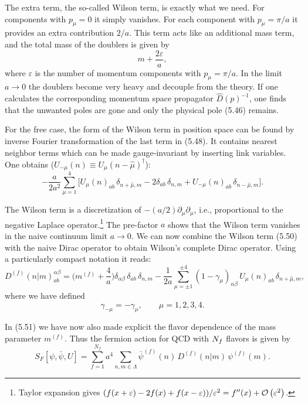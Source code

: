 The extra term, the so-called Wilson term, is exactly what we need. For
components with $p_\mu = 0$ it simply vanishes. For each component with $p_\mu =
\pi/a$ it provides an extra contribution $2/a$. This term acts like an additional
mass term, and the total mass of the doublers is given by
\begin{equation}
  m + \frac{2\varepsilon}{a} ,
\end{equation}
where $\varepsilon$ is the number of momentum components with $p_\mu = \pi/a$. In the limit
$a \to 0$ the doublers become very heavy and decouple from the theory. If one
calculates the corresponding momentum space propagator $\hat{D}(p)^{-1}$, one finds
that the unwanted poles are gone and only the physical pole (5.46) remains.

For the free case, the form of the Wilson term in position space can be
found by inverse Fourier transformation of the last term in (5.48). It contains
nearest neighbor terms which can be made gauge-invariant by inserting link
variables. One obtains ($U_{-\mu}(n) \equiv U_\mu(n-\hat{\mu})^\dagger$):
\begin{equation}
  -\frac{a}{2a^2}\sum_{\mu=1}^{4}\Big[
    U_\mu(n)_{ab}\,\delta_{n+\hat{\mu},m} - 2\delta_{ab}\,\delta_{n,m}
    + U_{-\mu}(n)_{ab}\,\delta_{n-\hat{\mu},m}\Big] .
\end{equation}

The Wilson term is a discretization of $-(a/2)\partial_\mu\partial_\mu$, i.e., proportional to the
negative Laplace operator.\footnote{Taylor expansion gives $(f(x + \varepsilon) - 2f(x) + f(x - \varepsilon))/\varepsilon^2 = f''(x) + \mathcal{O}\left(\varepsilon^2\right)$.} The pre-factor $a$ shows that the Wilson term
vanishes in the naive continuum limit $a \to 0$. We can now combine the Wilson
term (5.50) with the naive Dirac operator to obtain Wilson's complete Dirac
operator. Using a particularly compact notation it reads:
\begin{equation}
  D^{(f)}(n|m)^{\alpha\beta}_{ab}
    = \Big(m^{(f)} + \frac{4}{a}\Big)\delta_{\alpha\beta}\,\delta_{ab}\,\delta_{n,m}
    - \frac{1}{2a}\sum_{\mu=\pm1}^{\pm4}(1-\gamma_\mu)_{\alpha\beta}\,
      U_\mu(n)_{ab}\,\delta_{n+\hat{\mu},m} ,
\end{equation}
where we have defined
\begin{equation}
  \gamma_{-\mu} = -\gamma_\mu, \qquad \mu = 1, 2, 3, 4 .
\end{equation}

In (5.51) we have now also made explicit the flavor dependence of the mass
parameter $m^{(f)}$. Thus the fermion action for QCD with $N_f$ flavors is given by
\begin{equation}
  S_F[\psi,\bar{\psi},U] = \sum_{f=1}^{N_f}a^4\sum_{n,m\in\Lambda}
    \bar{\psi}^{(f)}(n)\,D^{(f)}(n|m)\,\psi^{(f)}(m) .
\end{equation}


